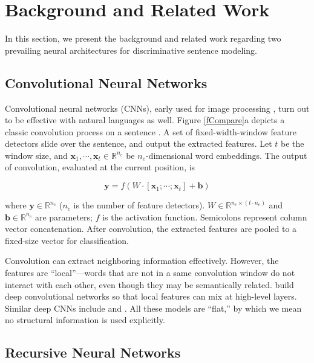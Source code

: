 \documentclass[11pt,a4paper]{article}
\begin{document}
\section{Background and Related Work}\label{sBackground}

In this section, we present the background and related work regarding
two prevailing neural architectures for discriminative sentence modeling.

\subsection{Convolutional Neural Networks}


Convolutional neural networks (CNNs), early used for image processing \cite{lenet},
turn out to be effective with natural languages as well.
Figure \ref{fCompare}a depicts a classic convolution
process on a sentence \cite{unified}.
A set of fixed-width-window feature detectors 
slide over the sentence, and output the extracted features.
Let $t$ be the window size, and $\bm x_1, \cdots, \bm x_t \in\mathbb{R}^{n_e}$
be $n_e$-dimensional
word embeddings.
The output of convolution, evaluated at the current position, is

\vspace{-.4cm}
$$\bm y=f\left(W\cdot \left[
\bm x_1;\cdots;\bm x_t\right]+\bm b\right)$$

\vspace{-.1cm}
\noindent where $\bm y\in \mathbb{R}^{n_c}$ ($n_c$ is the number of feature detectors). $W\in\mathbb{R}^{n_c\times (t\cdot n_e)}$ and $\bm b\in\mathbb{R}^{n_c}$ are parameters; $f$ is the activation function. Semicolons represent
 column vector concatenation.
After convolution, the extracted features are pooled to a fixed-size vector for classification.

Convolution can extract neighboring information effectively.
However, the features are ``local''---words that are not in a same convolution window do not interact with each other, even though they may be semantically related.
 build deep convolutional networks so that
local features can mix at high-level layers.
Similar deep CNNs include  and .
All these models are ``flat,'' by which we mean no structural information
is used explicitly.





\subsection{Recursive Neural Networks}
\end{document}
